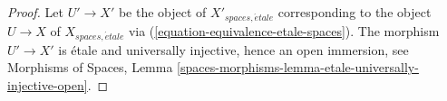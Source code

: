 \documentclass[10pt,a4paper]{amsart}
\theoremstyle{plain}
\theoremstyle{definition}
\theoremstyle{remark}
\numberwithin{equation}{subsection}
\def\etale{{\acute{e}tale}}
\begin{document}
\begin{proof}
Let $U' \to X'$ be the object of $X'_{spaces, \etale}$
corresponding to the object $U \to X$ of $X_{spaces, \etale}$
via (\ref{equation-equivalence-etale-spaces}). The morphism
$U' \to X'$ is \'etale and universally injective, hence an open immersion, see
Morphisms of Spaces,
Lemma \ref{spaces-morphisms-lemma-etale-universally-injective-open}.
\end{proof}
\end{document}
